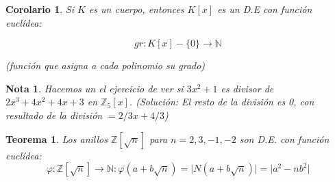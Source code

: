 \documentclass[11pt, a4paper, titlepage]{article}
\providecommand{\ent}{\mathbb{Z}}
\providecommand{\nat}{\mathbb{N}}
\providecommand{\abs}[1]{\lvert#1\rvert}
\theoremstyle{theorem-style}
\newtheorem*{nth}{Teorema}
\newtheorem{ncor}{Corolario}
\theoremstyle{definition-style}
\theoremstyle{remark-style}
\newtheorem*{nota}{Nota}
\theoremstyle{example-style}
\begin{document}
\begin{ncor}
	Si $K$ es un cuerpo, entonces $K[x]$ es un D.E con función euclídea:
	
	\[
	gr: K[x]-\{0\} \to \nat
	\]
	
(función que asigna a cada polinomio su grado)
\end{ncor}

\begin{nota}
	Hacemos un el ejercicio de ver si $3x^2 +1$ es divisor de $2x^3 + 4x^2 +4x +3$ en $\ent _5[x]$. (Solución: El resto de la división es 0, con resultado de la división $= 2/3 x + 4/3$)
\end{nota}


\begin{nth}
	Los anillos $\ent[\sqrt{n}]$ para $n=2,3,-1,-2$ son D.E. con función euclídea:
	\[
	\varphi: \ent[\sqrt{n}] \to \nat : \varphi(a+b\sqrt{n}) = \abs{N(a+b\sqrt{n})} = \abs{a^2 - nb^2}
	\]
	
	
\end{nth}
\end{document}
